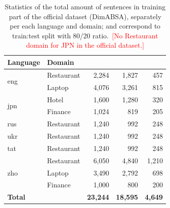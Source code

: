 \begin{table}[!t]
    \centering
    \small
    \begin{tabular}{ll|r|rr}
    \toprule
    \textbf{Language} & \textbf{Domain} & \dimabsaTrainData{} & \dimabsaTrainActual{} & \dimabsaTrainEval{} \\
    \midrule
    \multirow{2}{*}{eng} & Restaurant & 2,284 & 1,827 & 457 \\
                        & Laptop     & 4,076 & 3,261 & 815 \\
    \midrule
    \multirow{2}{*}{jpn} & Hotel      & 1,600 & 1,280 & 320 \\
                        & Finance    & 1,024 &   819 & 205 \\
    \midrule
    rus & Restaurant & 1,240 & 992 & 248 \\
    \midrule
    ukr & Restaurant & 1,240 & 992 & 248 \\
    \midrule
    tat & Restaurant & 1,240 & 992 & 248 \\
    \midrule
    \multirow{3}{*}{zho} & Restaurant & 6,050 & 4,840 & 1,210 \\
                        & Laptop     & 3,490 & 2,792 & 698 \\
                        & Finance    & 1,000 &   800 & 200 \\
    \midrule
    \textbf{Total} & & \textbf{23,244} & \textbf{18,595} & \textbf{4,649} \\
    \bottomrule
    \end{tabular}
    \caption{Statistics of the total amount of sentences in training part of the official dataset (DimABSA), separately per each language and domain; \dimabsaTrainActual{} and \dimabsaTrainEval{} correspond to \dimabsaTrainData{} train:test split with 80/20 ratio.~\textcolor{red}{[No Restaurant domain for JPN in the official dataset.]}}
    \label{tab:dataset_stats}
\end{table}
